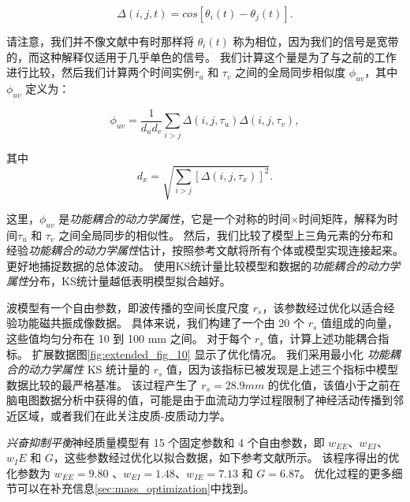 \documentclass[lang=cn,a4paper,newtx]{elegantpaper}
\begin{document}
\begin{equation}\label{eq:synchrony}
	\Delta(i,j,t) = cos [\theta_i (t) - \theta_j (t)].
\end{equation}

请注意，我们并不像文献中有时那样将 $ \theta_i(t) $ 称为相位，因为我们的信号是宽带的，而这种解释仅适用于几乎单色的信号。
我们计算这个量是为了与之前的工作进行比较\cite{deco2021dynamical,aquino2022intersection}，然后我们计算两个时间实例$ \tau_u $ 和 $ \tau_v $ 之间的全局同步相似度 $ \phi_{uv} $，其中 $ \phi_{uv} $ 定义为：

\begin{equation}\label{eq:synchrony_similarity}
	\phi_{uv} = \frac{1}{d_u d_v} 
				\sum_{i>j} \Delta(i,j,\tau_u) \Delta(i,j,\tau_v),
\end{equation}

其中
\begin{equation}\label{key}
	d_x = \sqrt{\sum_{i>j}
					[
					\Delta(i,j,\tau_x)
					]^2
				}.
\end{equation}

这里，$ \phi_{uv} $ 是\textit{功能耦合的动力学属性}，它是一个对称的时间$ \times $时间矩阵，解释为时间$ \tau_u $ 和 $ \tau_v $ 之间全局同步的相似性。
然后，我们比较了模型上三角元素的分布和经验\textit{功能耦合的动力学属性}估计，按照参考文献将所有个体或模型实现连接起来\cite{aquino2022intersection}。
更好地捕捉数据的总体波动。
使用KS统计量比较模型和数据的\textit{功能耦合的动力学属性}分布，KS统计量越低表明模型拟合越好。


波模型有一个自由参数，即波传播的空间长度尺度 $ r_s $，该参数经过优化以适合经验功能磁共振成像数据。
具体来说，我们构建了一个由 20 个 $ r_s $ 值组成的向量，这些值均匀分布在 10 到 100 mm 之间。
对于每个 $ r_s $ 值，计算上述功能耦合指标。
扩展数据图\ref{fig:extended_fig_10} 显示了优化情况。
我们采用最小化 \textit{功能耦合的动力学属性} KS 统计量的 $ r_s $ 值，因为该指标已被发现是上述三个指标中模型数据比较的最严格基准\cite{aquino2022intersection}。
该过程产生了 $ r_s = 28.9 mm $ 的优化值，该值小于之前在脑电图数据分析中获得的值\cite{robinson2005multiscale}，可能是由于血流动力学过程限制了神经活动传播到邻近区域，或者我们在此关注皮质-皮质动力学\cite{aquino2012hemodynamic,pang2017effects}。


\textit{兴奋抑制平衡}神经质量模型有 15 个固定参数和 4 个自由参数，即 $ w_{EE} $、$ w_{EI} $、$ w_IE $ 和 $ G $，这些参数经过优化以拟合数据，如下参考文献\cite{demirtacs2019hierarchical}所示。
该程序得出的优化参数为 $ w_{EE} = 9.80 $ 、$ w_{EI} = 1.48 $、$ w_{IE} = 7.13 $ 和 $ G = 6.87 $。
优化过程的更多细节可以在补充信息\ref{sec:mass_optimization}中找到。
\end{document}
